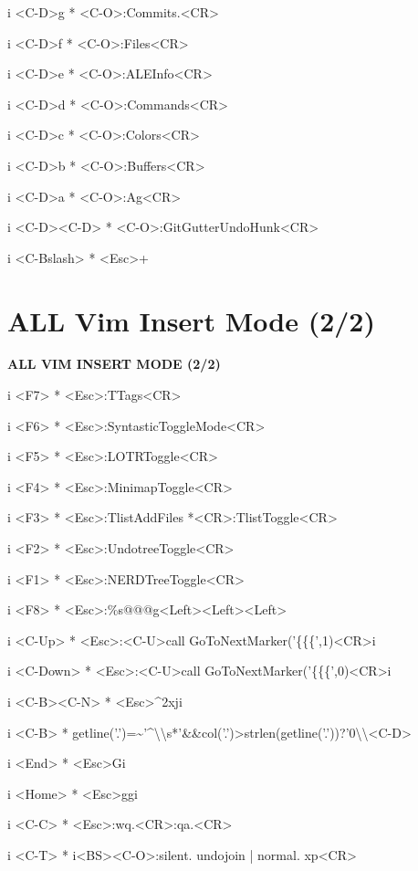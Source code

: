 \documentclass[11pt,a4paper,twoside]{book}
\begin{document}
i  <C-D>g  * <C-O>:Commits.<CR>

i  <C-D>f  * <C-O>:Files<CR>

i  <C-D>e  * <C-O>:ALEInfo<CR>

i  <C-D>d  * <C-O>:Commands<CR>

i  <C-D>c  * <C-O>:Colors<CR>

i  <C-D>b  * <C-O>:Buffers<CR>

i  <C-D>a  * <C-O>:Ag<CR>

i  <C-D><C-D>  * <C-O>:GitGutterUndoHunk<CR>

i  <C-Bslash>  * <Esc>+


\vspace{16pt}

\section{ALL Vim Insert Mode (2/2)}


\vspace{10pt}
{\large\bfseries\color{neoncyan} ALL VIM INSERT MODE (2/2)}\vspace{6pt}

i  <F7>  * <Esc>:TTags<CR>

i  <F6>  * <Esc>:SyntasticToggleMode<CR>

i  <F5>  * <Esc>:LOTRToggle<CR>

i  <F4>  * <Esc>:MinimapToggle<CR>

i  <F3>  * <Esc>:TlistAddFiles *<CR>:TlistToggle<CR>

i  <F2>  * <Esc>:UndotreeToggle<CR>

i  <F1>  * <Esc>:NERDTreeToggle<CR>

i  <F8>  * <Esc>:\%s@@@g<Left><Left><Left>

i  <C-Up>  * <Esc>:<C-U>call GoToNextMarker('\{\{\{',1)<CR>i

i  <C-Down>  * <Esc>:<C-U>call GoToNextMarker('\{\{\{',0)<CR>i

i  <C-B><C-N>  * <Esc>\textasciicircum{}2xji

i  <C-B>  * getline('.')=\textasciitilde{}'\textasciicircum{}\textbackslash{}\textbackslash{}s*'\&\&col('.')>strlen(getline('.'))?'0\textbackslash{}\textbackslash{}<C-D>

i  <End>  * <Esc>Gi

i  <Home>  * <Esc>ggi

i  <C-C>  * <Esc>:wq.<CR>:qa.<CR>

i  <C-T>  * i<BS><C-O>:silent. undojoin | normal. xp<CR>
\end{document}
